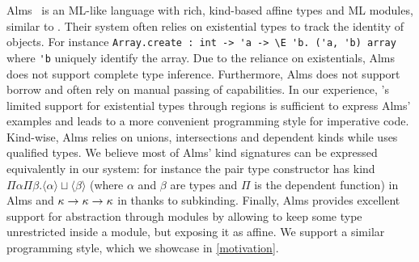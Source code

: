 Alms~\citep{DBLP:conf/popl/TovP11} is an ML-like language with rich, kind-based
affine types and ML modules, similar to \lang.
Their system often relies on existential types to track the identity
of objects. For instance
\lstinline/Array.create : int -> 'a -> \E 'b. ('a, 'b) array/ where
\lstinline/'b/ uniquely identify the array.
Due to the reliance on existentials, Alms does not support complete type inference.
Furthermore, Alms does not support borrow and often rely
on manual passing of capabilities.
In our experience, \affe's limited support for existential types through
regions is sufficient to express Alms' examples and leads to
a more convenient programming style for imperative code.
%
Kind-wise, Alms relies
on unions, intersections and dependent kinds while
\lang uses qualified types.
We believe most of Alms' kind signatures can be expressed equivalently in
our system: for instance the pair type constructor
has kind $\Pi\alpha\Pi\beta. \langle\alpha\rangle \sqcup \langle\beta\rangle$
(where $\alpha$ and $\beta$ are types and $\Pi$ is the dependent function)
in Alms and $\kappa\to\kappa\to\kappa$ in \lang thanks
to subkinding.
%
Finally, Alms provides excellent support for abstraction through
modules by allowing to keep some type unrestricted inside a module, but
exposing it as affine. We support a similar programming style, which
we showcase in \cref{motivation}.

